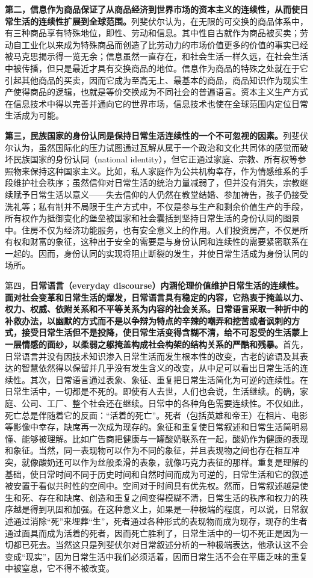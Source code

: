 \documentclass[UTF8, fontset = sourcesans, a4paper, oneside, zihao =
-4, scheme=chinese, no-math, space=true]{ctexbook}
\begin{document}
\textbf{第二，信息作为商品保证了从商品经济到世界市场的资本主义的连续性，从而使日常生活的连续性扩展到全球范围。}列斐伏尔认为，在无限的可交换的商品体系中，有三种商品享有特殊地位，即性、劳动和信息。其中性自古就作为商品被买卖；劳动自工业化以来成为特殊商品而创造了比劳动力的市场价值更多的价值的事实已经被马克思揭示得一览无余；信息虽然一直存在，和社会生活一样久远，在社会生活中被传播，但只是最近才具有交换商品的地位。信息作为商品的特殊之处就在于它引起其他商品的买卖，因而它成为至高无上、最基本的商品，商品知识作为现实生产使得商品的逻辑，也就是等价交换成为不同社会的普遍语言。资本主义生产方式在信息技术中得以完善并通向它的世界市场，信息技术也使在全球范围内定位日常生活成为可能。

\textbf{第三，民族国家的身份认同是保持日常生活连续性的一个不可忽视的因素。}列斐伏尔认为，虽然国际化的压力试图通过瓦解从属于一个政治和文化共同体的感觉而破坏民族国家的身份认同（national identity），但它正通过家庭、宗教、所有权等参照物来保持这种国家主义。比如，私人家庭作为公共机构幸存，作为情感维系的手段维护社会秩序；虽然信仰对日常生活的统治力量减弱了，但并没有消失，宗教继续赋予日常生活以意义------失去信仰的人仍然在教堂结婚、参加祷告，孩子仍接受洗礼等；私有制并不局限于生产方式中，不仅是参与生产和剩余价值生产的手段，所有权作为抵御变化的堡垒被国家和社会囊括到坚持日常生活的身份认同的图景中。住房不仅为经济功能服务，也有安全意义上的作用。人们投资房产，不仅是所有权和财富的象征，这种出于安全的需要是与身份认同和连续性的需要紧密联系在一起的。因而，身份认同的实现将阻止断裂的发生，并使日常生活成为身份认同的场所。

第四，\textbf{日常语言（everyday
discourse）内涵伦理价值维护日常生活的连续性。面对社会变革和日常生活的爆发，日常语言具有稳定的内容，它热衷于掩盖以力、权力、权威、依附关系和不平等关系为内容的社会关系。日常语言采取一种折中的补救办法，以幽默的方式而不是以争辩为特点的辛辣的嘲弄和挖苦或者讽刺的方式，接受日常生活但不是投降，使日常生活变得含糊不清，给不可忍受的生活蒙上一层情感的面纱，以柔弱之躯掩盖构成社会构架的结构关系的严酷和残暴。}首先，日常语言并没有因技术知识渗入日常生活而发生根本性的改变，古老的谚语及其表达的智慧依然得以保留并几乎没有发生含义的改变，从中足可以看出日常生活的连续性。其次，日常语言通过表象、象征、重复把日常生活简化为可逆的连续性。在日常生活中，一切都是不死的。即使有人去世，人们也会说，生活继续。的确，家庭、公司、工厂、整个社会还在继续。日常中的各种角色需要连续性。不仅如此，死亡总是伴随着它的反面：``活着的死亡''。死者（包括英雄和帝王）在相片、电影等影像中幸存，缺席再一次成为现存的。象征和重复使日常叙述和日常生活简明易懂、能够被理解。比如广告商把健康与一罐酸奶联系在一起，酸奶作为健康的表现和象征。当然，同一表现物可以作为不同的象征，并且表现物之间也存在相互冲突，就像酸奶还可以作为丝般柔滑的表象，就像巧克力表征的那样。重复是理解的基础，使日常时间不同于历史时间和自然时间而成为可逆的，日常生活和它的叙述被安置于看似共时性的空间中。空间对于时间具有优先权。然而，日常叙述越是使生和死、存在和缺席、创造和重复之间变得模糊不清，日常生活的秩序和权力的秩序越是得到巩固和加强。在这种意义上，如果是一种极端的程度，可以说，日常叙述通过消除``死''来埋葬``生''，死者通过各种形式的表现物而成为现存，现存的生者通过面具而成为活着的死者，因而死亡胜利了，日常生活中的一切不死正是因为一切都已死去。当然这只是列斐伏尔对日常叙述分析的一种极端表达，他承认这不会变成``现实''，因为日常生活中我们必须活着，因而日常生活不会在平庸乏味的重复中被窒息，它不得不被改变。
\end{document}
